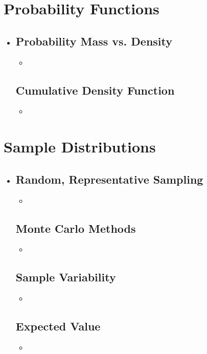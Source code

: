 \section{Probability Functions}
\begin{itemize}
  \item []
  
  \subsection{Probability Mass vs. Density}
  \begin{itemize}
    \item 
  \end{itemize}

  \subsection{Cumulative Density Function}
  \begin{itemize}
    \item 
  \end{itemize}
  
\end{itemize}

\section{Sample Distributions}
\begin{itemize}
  \item[]
  
  \subsection{Random, Representative Sampling}
  \begin{itemize}
    \item 
  \end{itemize}

  \subsection{Monte Carlo Methods}
  \begin{itemize}
    \item 
  \end{itemize}
  
  \subsection{Sample Variability}
  \begin{itemize}
    \item 
  \end{itemize}

  \subsection{Expected Value}
  \begin{itemize}
    \item 
  \end{itemize}
  
\end{itemize}

